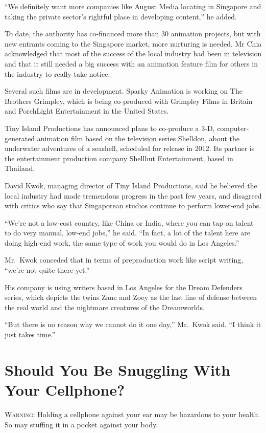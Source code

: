 ﻿\documentclass[12pt]{article}
\begin{document}
``We definitely want more companies like August Media locating in Singapore and taking the private
sector's rightful place in developing content,'' he added.

To date, the authority has co-financed more than 30 animation projects, but with new entrants coming
to the Singapore market, more nurturing is needed. Mr Chia acknowledged that most of the success of
the local industry had been in television and that it still needed a big success with an animation
feature film for others in the industry to really take notice.

Several such films are in development. Sparky Animation is working on The Brothers Grimpley, which
is being co-produced with Grimpley Films in Britain and PorchLight Entertainment in the United
States.

Tiny Island Productions has announced plans to co-produce a 3-D, computer-generated animation film
based on the television series Shelldon, about the underwater adventures of a seashell, scheduled
for release in 2012. Its partner is the entertainment production company Shellhut Entertainment,
based in Thailand.

David Kwok, managing director of Tiny Island Productions, said he believed the local industry had
made tremendous progress in the past few years, and disagreed with critics who say that Singaporean
studios continue to perform lower-end jobs.

``We're not a low-cost country, like China or India, where you can tap on talent to do very manual,
low-end jobs,'' he said. ``In fact, a lot of the talent here are doing high-end work, the same type
of work you would do in Los Angeles.''

Mr.~Kwok conceded that in terms of preproduction work like script writing, ``we're not quite there
yet.''

His company is using writers based in Los Angeles for the Dream Defenders series, which depicts the
twins Zane and Zoey as the last line of defense between the real world and the nightmare creatures
of the Dreamworlds.

``But there is no reason why we cannot do it one day,'' Mr.~Kwok said. ``I think it just takes
time.''

\section{Should You Be Snuggling With Your Cellphone?}

\lettrine{W}{arning}: Holding a cellphone against your ear may be hazardous
to your health. So may stuffing it in a pocket against your body.
\end{document}
